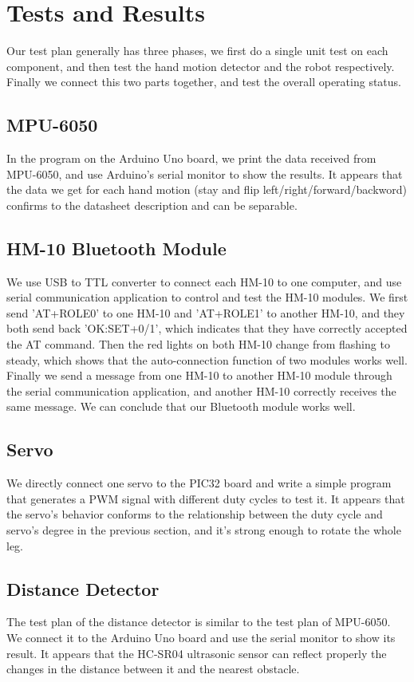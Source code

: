 \documentclass[a4paper]{article}
\begin{document}
\section{Tests and Results}
Our test plan generally has three phases, we first do a single unit test on each component, and then test the hand motion detector and the robot respectively. Finally we connect this two parts together, and test the overall operating status.
\subsection{MPU-6050}
In the program on the Arduino Uno board, we print the data received from MPU-6050, and use Arduino's serial monitor to show the results. It appears that the data we get for each hand motion (stay and flip left/right/forward/backword) confirms to the datasheet description and can be separable.

\subsection{HM-10 Bluetooth Module}
We use USB to TTL converter to connect each HM-10 to one computer, and use serial communication application to control and test the HM-10 modules. We first send 'AT+ROLE0' to one HM-10 and 'AT+ROLE1' to another HM-10, and they both send back 'OK:SET+0/1', which indicates that they have correctly accepted the AT command. Then the red lights on both HM-10 change from flashing to steady, which shows that the auto-connection function of two modules works well. Finally we send a message from one HM-10 to another HM-10 module through the serial communication application, and another HM-10 correctly receives the same message. We can conclude that our Bluetooth module works well.

\subsection{Servo}
We directly connect one servo to the PIC32 board and write a simple program that generates a PWM signal with different duty cycles to test it. It appears that the servo's behavior conforms to the relationship between the duty cycle and servo's degree in the previous section, and it's strong enough to rotate the whole leg.

\subsection{Distance Detector}
The test plan of the distance detector is similar to the test plan of MPU-6050. We connect it to the Arduino Uno board and use the serial monitor to show its result. It appears that the HC-SR04 ultrasonic sensor can reflect properly the changes in the distance between it and the nearest obstacle.
\end{document}
